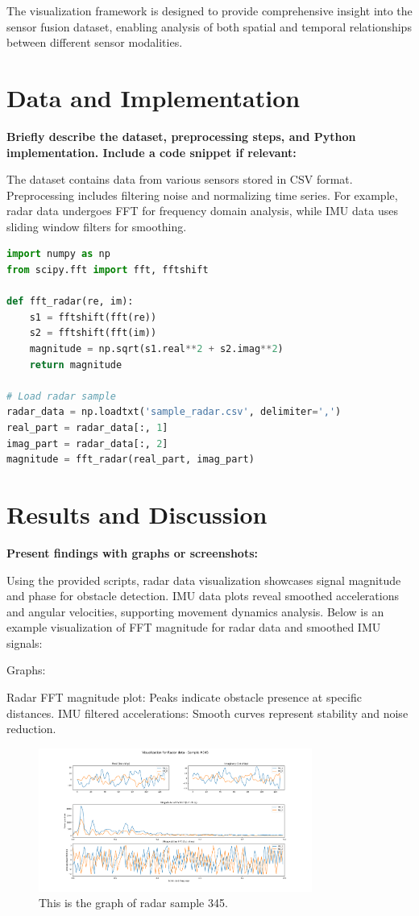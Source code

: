 \documentclass[12pt,a4paper]{article}
\begin{document}
The visualization framework is designed to provide comprehensive insight into the sensor fusion dataset, enabling analysis of both spatial and temporal relationships between different sensor modalities.
\section{Data and Implementation}
\textbf{Briefly describe the dataset, preprocessing steps, and Python implementation. Include a code snippet if relevant:}

The dataset contains data from various sensors stored in CSV format. Preprocessing includes filtering noise and normalizing time series. For example, radar data undergoes FFT for frequency domain analysis, while IMU data uses sliding window filters for smoothing.

\begin{lstlisting}[language=Python, caption=Radar Data undergoes FFT]
import numpy as np
from scipy.fft import fft, fftshift

def fft_radar(re, im):
    s1 = fftshift(fft(re))
    s2 = fftshift(fft(im))
    magnitude = np.sqrt(s1.real**2 + s2.imag**2)
    return magnitude

# Load radar sample
radar_data = np.loadtxt('sample_radar.csv', delimiter=',')
real_part = radar_data[:, 1]
imag_part = radar_data[:, 2]
magnitude = fft_radar(real_part, imag_part)

\end{lstlisting}
\section{Results and Discussion}
\textbf{Present findings with graphs or screenshots:}

Using the provided scripts, radar data visualization showcases signal magnitude and phase for obstacle detection. IMU data plots reveal smoothed accelerations and angular velocities, supporting movement dynamics analysis. Below is an example visualization of FFT magnitude for radar data and smoothed IMU signals:

Graphs:

Radar FFT magnitude plot: Peaks indicate obstacle presence at specific distances.
IMU filtered accelerations: Smooth curves represent stability and noise reduction.
\begin{figure}[h!]
    \centering
    \includegraphics[width=0.8\textwidth]{radar_sample_345.png} 
    \caption{This is the graph of radar sample 345.}
    \label{fig:Radar_sample_345}
\end{figure}
\end{document}
